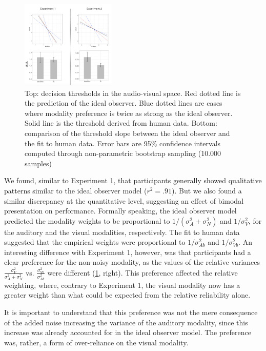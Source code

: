 \documentclass[10pt,letterpaper]{article}
\begin{document}
\begin{figure}[h]
\centering
\includegraphics[width=0.4\textwidth]{preference.png}
\caption{Top: decision thresholds in the audio-visual space. Red dotted line is the prediction of the ideal observer. Blue dotted lines are cases where modality preference is twice as strong as the ideal observer. Solid line is the threshold derived from human data. Bottom: comparison of the threshold slope between the ideal observer and the fit to human data. Error bars are 95\% confidence intervals computed through non-parametric bootstrap sampling (10.000 samples)}
\label{fig:pref}
\end{figure}

We found, similar to Experiment 1, that participants generally showed qualitative patterns similar to the ideal observer model ($r^2 = .91$). But we also found a similar discrepancy at the quantitative level, suggesting an effect of bimodal presentation on performance. Formally speaking, the ideal observer model predicted the modality weights to be proportional to $1/(\sigma^2_{A}+\sigma^2_{N})$ and $1/\sigma^2_{V}$, for the auditory and the visual modalities, respectively. The fit to human data suggested that the empirical weights were proportional to $1/\sigma^2_{Ab}$ and $1/\sigma^2_{Vb}$. An interesting difference with Experiment 1, however, was that participants had a clear preference for the non-noisy modality, as the values of the relative variances $\frac{\sigma^2_V}{\sigma^2_A + \sigma^2_N}$ vs. $\frac{\sigma^2_{Vb}}{\sigma^2_{Ab}}$ were different (\ref{fig:pref}, right). This preference affected the relative weighting, where, contrary to Experiment 1, the visual modality now has a greater weight than what could be expected from the relative reliability alone.

It is important to understand that this preference was not the mere consequence of the added noise increasing the variance of the auditory modality, since this increase was already accounted for in the ideal observer model. The preference was, rather, a form of over-reliance on the visual modality.
\end{document}
